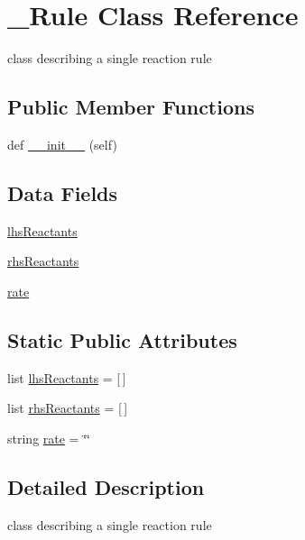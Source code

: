 \hypertarget{class_mu_mo_t_1_1_mu_mo_t_1_1___rule}{}\section{\+\_\+\+Rule Class Reference}
\label{class_mu_mo_t_1_1_mu_mo_t_1_1___rule}


class describing a single reaction rule  


\subsection*{Public Member Functions}
\begin{DoxyCompactItemize}
\item 
def \hyperlink{class_mu_mo_t_1_1_mu_mo_t_1_1___rule_ae64f0875afe3067b97ba370b354b9213}{\+\_\+\+\_\+init\+\_\+\+\_\+} (self)
\end{DoxyCompactItemize}
\subsection*{Data Fields}
\begin{DoxyCompactItemize}
\item 
\hyperlink{class_mu_mo_t_1_1_mu_mo_t_1_1___rule_ac74b250c5bb6d9c932272ab5ba3e7a9a}{lhs\+Reactants}
\item 
\hyperlink{class_mu_mo_t_1_1_mu_mo_t_1_1___rule_ad26a9ebdfecee5e673d2091e9780a5df}{rhs\+Reactants}
\item 
\hyperlink{class_mu_mo_t_1_1_mu_mo_t_1_1___rule_a1d580470818c2fa51a0bf3a86bc595bf}{rate}
\end{DoxyCompactItemize}
\subsection*{Static Public Attributes}
\begin{DoxyCompactItemize}
\item 
list \hyperlink{class_mu_mo_t_1_1_mu_mo_t_1_1___rule_abda7634f206816d08628031e2ccff839}{lhs\+Reactants} = \mbox{[}$\,$\mbox{]}
\item 
list \hyperlink{class_mu_mo_t_1_1_mu_mo_t_1_1___rule_a905a778fdb168004b0daf5839672fb9b}{rhs\+Reactants} = \mbox{[}$\,$\mbox{]}
\item 
string \hyperlink{class_mu_mo_t_1_1_mu_mo_t_1_1___rule_a7d242d56dec64e54f0a1e7e9981eda54}{rate} = \char`\"{}\char`\"{}
\end{DoxyCompactItemize}


\subsection{Detailed Description}
class describing a single reaction rule 

